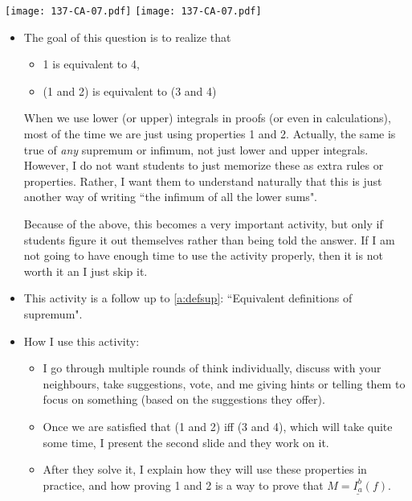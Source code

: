 \documentclass[11pt]{article}
\newcommand {\DS} [1] {${\displaystyle #1}$}
\newcommand{\nl}{\hfill \vspace{-1.1\baselineskip}} %
\begin{document}
\begin{center}
{ \texttt{[image: 137-CA-07.pdf]}} \quad
{ \texttt{[image: 137-CA-07.pdf]}} 
\end{center}

\begin{comments}
\nl
	\begin{itemize}
		\item The goal of this question is to realize that 
			\begin{itemize}
				\item 1 is equivalent to 4,
				\item  (1 and 2) is equivalent to (3 and 4)
			\end{itemize}
			  When we use lower (or upper) integrals in proofs (or even in calculations), most of the time we are just using properties 1 and 2.  Actually, the same is true of \emph{any} supremum or infimum, not just lower and upper integrals.  However, I do not want students to just memorize these as extra rules or properties.  Rather, I want them to understand naturally that this is just another way of writing ``the infimum of all the lower sums".
		
		Because of the above, this becomes a very important activity, but only if students figure it out themselves rather than being told the answer.  If I am not going to have enough time to use the activity properly, then it is not worth it an I just skip it.
		
		\item This activity is a follow up to \autoref{a:defsup}: ``Equivalent definitions of supremum".  
		
		\item How I use this activity:
			\begin{itemize}
				\item  I go through multiple rounds of think individually, discuss with your neighbours, take suggestions, vote, and me giving hints or telling them to focus on something (based on the suggestions they offer).
				\item  Once we are satisfied that (1 and 2) iff (3 and 4), which will take quite some time, I present the second slide and they work on it.
				\item After they solve it, I explain how they will use these properties in practice, and how proving 1 and 2 is a way to prove that \DS{M= \underline{I_a^b}(f)}.
			\end{itemize}
	\end{itemize}
\end{comments}
\end{document}
